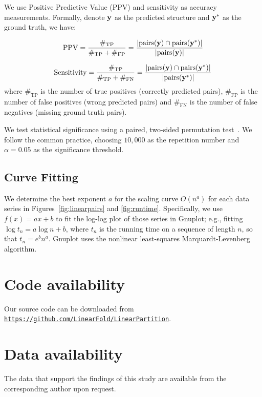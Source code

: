 We use Positive Predictive Value (PPV)
and sensitivity 
as accuracy measurements. 
Formally, denote $\mathbf{y}$ as the predicted structure and $\mathbf{y}^{*}$ as the ground
truth, we have:

$$\text{PPV} = \frac{\#_{\text {TP}}}{\#_{\text {TP}} + \#_{\text {FP}}}  = 
\frac{|\text{pairs}(\mathbf{y}) \cap \text{pairs}(\mathbf{y}^*)|}{|\text{pairs}(\mathbf{y})|} $$

$$ \text{Sensitivity} = \frac{\#_{\text {TP}}}{\#_{\text {TP}} + \#_{\text {FN}}}  =
\frac{|\text{pairs}(\mathbf{y}) \cap \text{pairs}(\mathbf{y}^*)|}{|\text{pairs}(\mathbf{y}^*)|}$$
where $\#_{\text {TP}}$ is the number of true positives (correctly predicted pairs),
$\#_{\text {FP}}$ is the number of false positives (wrong predicted pairs)
and $\#_{\text {FN}}$ is the number of false negatives (missing ground truth pairs).

We test statistical significance using a paired, two-sided permutation test~\cite{Aghaeepour+Hoos:2013}.
We follow the common practice, choosing $10,000$ as the repetition number
and $\alpha=0.05$ as the significance threshold.

\subsection*{Curve Fitting}
We determine the best exponent $a$ for the scaling curve $O(n^a)$ for each data series in Figures~\ref{fig:linearpairs} and \ref{fig:runtime}.
Specifically, we use $f(x) = a x + b$ to fit the log-log plot of those series in Gnuplot;
e.g., fitting $\log t_n = a \log n + b$, where $t_n$ is the running time on a sequence of length $n$,
so that $t_n = e^b n^a$.
Gnuplot uses the nonlinear least-squares Marquardt-Levenberg algorithm.


\section*{Code availability}\label{code}

Our \linearpartition source code can be downloaded  from\\ 
{\tt\url{https://github.com/LinearFold/LinearPartition}}.

\section*{Data availability}


The data that support the findings of this study are available from the corresponding author upon request.

